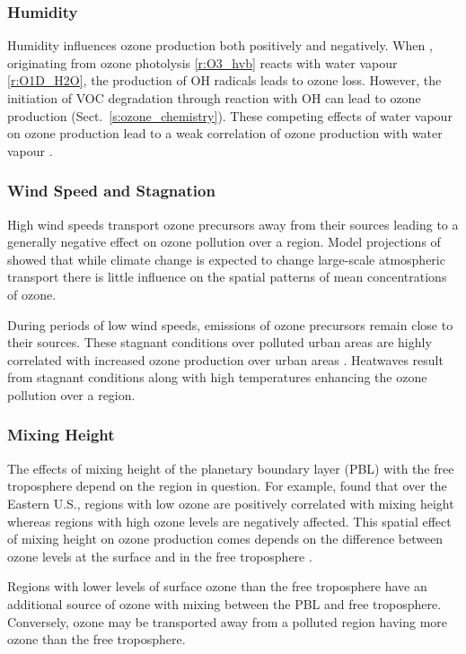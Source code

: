 \subsubsection{Humidity}
Humidity influences ozone production both positively and negatively.
When , originating from ozone photolysis \eqref{r:O3_hvb} reacts with water vapour \eqref{r:O1D_H2O}, the production of OH radicals leads to ozone loss.
However, the initiation of VOC degradation through reaction with OH can lead to ozone production (Sect.~\ref{s:ozone_chemistry}).
These competing effects of water vapour on ozone production lead to a weak correlation of ozone production with water vapour \citep{Jacob:2009}.

\subsubsection{Wind Speed and Stagnation}
High wind speeds transport ozone precursors away from their sources leading to a generally negative effect on ozone pollution over a region.
Model projections of \citet{Doherty:2013} showed that while climate change is expected to change large-scale atmospheric transport there is little influence on the spatial patterns of mean concentrations of ozone.

During periods of low wind speeds, emissions of ozone precursors remain close to their sources.
These stagnant conditions over polluted urban areas are highly correlated with increased ozone production over urban areas \citep{Jacob:2009}.
Heatwaves result from stagnant conditions along with high temperatures enhancing the ozone pollution over a region.

\subsubsection{Mixing Height}
The effects of mixing height of the planetary boundary layer (PBL) with the free troposphere depend on the region in question.
For example, \citet{Dawson:2007} found that over the Eastern U.S., regions with low ozone are positively correlated with mixing height whereas regions with high ozone levels are negatively affected.
This spatial effect of mixing height on ozone production comes depends on the difference between ozone levels at the surface and in the free troposphere \citep{Jacob:2009}.

Regions with lower levels of surface ozone than the free troposphere have an additional source of ozone with mixing between the PBL and free troposphere.
Conversely, ozone may be transported away from a polluted region having more ozone than the free troposphere.

